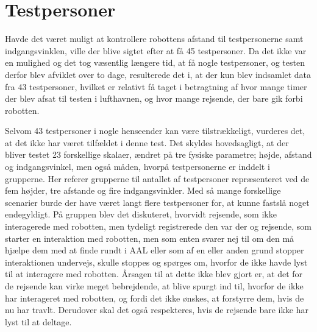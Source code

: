 \section{Testpersoner}
\label{DiskussionTestpersoner}
%
Havde det været muligt at kontrollere robottens afstand til testpersonerne samt indgangsvinklen, ville der blive sigtet efter at få 45 testpersoner. Da det ikke var en mulighed og det tog væsentlig længere tid, at få nogle testpersoner, og testen derfor blev afviklet over to dage, resulterede det i, at der kun blev indsamlet data fra 43 testpersoner, hvilket er relativt få taget i betragtning af hvor mange timer der blev afsat til testen i lufthavnen, og hvor mange rejsende, der bare gik forbi robotten.

Selvom 43 testpersoner i nogle henseender kan være tilstrækkeligt, vurderes det, at det ikke har været tilfældet i denne test. Det skyldes hovedsagligt, at der bliver testet 23 forskellige skalaer, ændret på tre fysiske parametre; højde, afstand og indgangsvinkel, men også måden, hvorpå testpersonerne er inddelt i grupperne. Her referer grupperne til antallet af testpersoner repræsenteret ved de fem højder, tre afstande og fire indgangsvinkler. Med så mange forskellige scenarier burde der have været langt flere testpersoner for, at kunne fastslå noget endegyldigt.\blankline
%
På gruppen blev det diskuteret, hvorvidt rejsende, som ikke interagerede med robotten, men tydeligt registrerede den var der og rejsende, som starter en interaktion med robotten, men som enten svarer nej til om den må hjælpe dem med at finde rundt i AAL eller som af en eller anden grund stopper interaktionen undervejs, skulle stoppes og spørges om, hvorfor de ikke havde lyst til at interagere med robotten. Årsagen til at dette ikke blev gjort er, at det for de rejsende kan virke meget bebrejdende, at blive spurgt ind til, hvorfor de ikke har interageret med robotten, og fordi det ikke ønskes, at forstyrre dem, hvis de nu har travlt. Derudover skal det også respekteres, hvis de rejsende bare ikke har lyst til at deltage. 

